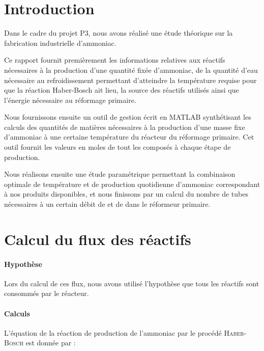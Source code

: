 
\usepackage[numbered, framed]{mcode}

\section{Introduction}
Dans le cadre du projet P3, nous avons réalisé une 
étude théorique sur la fabrication
industrielle d'ammoniac.

Ce rapport fournit premièrement les informations relatives
aux réactifs nécessaires à la production d'une quantité fixée 
d'ammoniac, de la quantité d'eau nécessaire au refroidissement
permettant d'atteindre la température requise pour que la 
réaction Haber-Bosch ait lieu, la source des réactifs utilisés
ainsi que l'énergie nécessaire au réformage 
primaire.

Nous fournissons ensuite un outil de gestion écrit en MATLAB 
synthétisant les calculs des quantités de matières nécessaires 
à la production d'une masse fixe d'ammoniac à une certaine 
température du réacteur du réformage primaire. Cet outil fournit 
les valeurs en moles de tout les composés à chaque étape de production.

Nous réalisons ensuite une étude paramétrique permettant la combinaison
optimale de température et de production quotidienne 
d'ammoniac correspondant à nos produits disponibles, et nous finissons
par un calcul du nombre de tubes nécessaires à un 
certain débit de  et de  dans le réformeur primaire.
\section{Calcul du flux des réactifs}
\paragraph{Hypothèse}
Lors du calcul de ces flux, nous avons utilisé l'hypothèse que 
tous les réactifs sont 
consommés par le réacteur.

\paragraph{Calculs}
L'équation de la réaction de production de l'ammoniac par le
procédé \textsc{Haber-Bosch} est donnée par :

